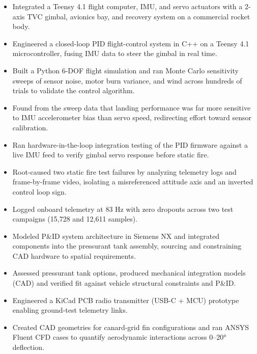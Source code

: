 \begin{itemize}
  \item Integrated a Teensy 4.1 flight computer, IMU, and servo actuators with a 2-axis TVC gimbal, avionics bay, and recovery system on a commercial rocket body.
  \item Engineered a closed-loop PID flight-control system in C++ on a Teensy 4.1 microcontroller, fusing IMU data to steer the gimbal in real time.
  \item Built a Python 6-DOF flight simulation and ran Monte Carlo sensitivity sweeps of sensor noise, motor burn variance, and wind across hundreds of trials to validate the control algorithm.
  \item Found from the sweep data that landing performance was far more sensitive to IMU accelerometer bias than servo speed, redirecting effort toward sensor calibration.
  \item Ran hardware-in-the-loop integration testing of the PID firmware against a live IMU feed to verify gimbal servo response before static fire.
  \item Root-caused two static fire test failures by analyzing telemetry logs and frame-by-frame video, isolating a misreferenced attitude axis and an inverted control loop sign.
  \item Logged onboard telemetry at 83 Hz with zero dropouts across two test campaigns (15,728 and 12,611 samples).
\end{itemize}
\entrygap

\begin{itemize}
  \item Modeled P\&ID system architecture in Siemens NX and integrated components into the pressurant tank assembly, sourcing and constraining CAD hardware to spatial requirements.
  \item Assessed pressurant tank options, produced mechanical integration models (CAD) and verified fit against vehicle structural constraints and P\&ID.
  \item Engineered a KiCad PCB radio transmitter (USB-C + MCU) prototype enabling ground-test telemetry links.
  \item Created CAD geometries for canard-grid fin configurations and ran ANSYS Fluent CFD cases to quantify aerodynamic interactions across 0--20° deflection.
\end{itemize}
\entrygap

